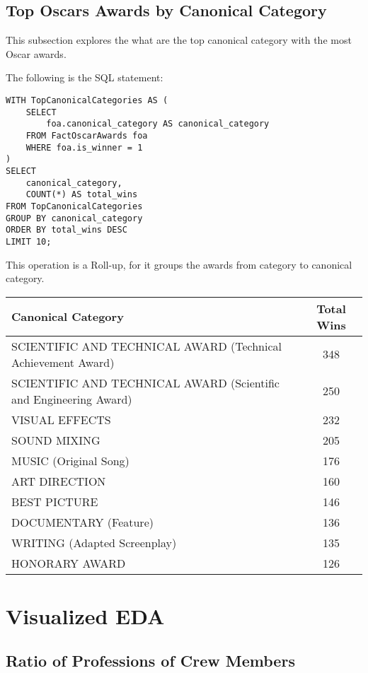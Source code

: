\documentclass[sigconf, pbalance]{acmart}
\begin{document}
\subsection{Top Oscars Awards by Canonical Category}

This subsection explores the what are the top canonical category with the most Oscar awards. 

The following is the SQL statement:
\begin{lstlisting}[style=SQLStyle]
WITH TopCanonicalCategories AS (
    SELECT
        foa.canonical_category AS canonical_category
    FROM FactOscarAwards foa
    WHERE foa.is_winner = 1
)
SELECT
    canonical_category,
    COUNT(*) AS total_wins
FROM TopCanonicalCategories
GROUP BY canonical_category
ORDER BY total_wins DESC
LIMIT 10;
\end{lstlisting}

This operation is a Roll-up, for it groups the awards from category to canonical category.

\begin{center}
\begin{tabular}{|p{8cm}|c|}
\hline
\textbf{Canonical Category} & \textbf{Total Wins} \\
\hline
SCIENTIFIC AND TECHNICAL AWARD (Technical Achievement Award) & 348 \\
SCIENTIFIC AND TECHNICAL AWARD (Scientific and Engineering Award) & 250 \\
VISUAL EFFECTS & 232 \\
SOUND MIXING & 205 \\
MUSIC (Original Song) & 176 \\
ART DIRECTION & 160 \\
BEST PICTURE & 146 \\
DOCUMENTARY (Feature) & 136 \\
WRITING (Adapted Screenplay) & 135 \\
HONORARY AWARD & 126 \\
\hline
\end{tabular}
\end{center}

\section{Visualized EDA}

\subsection{Ratio of Professions of Crew Members}
\end{document}
